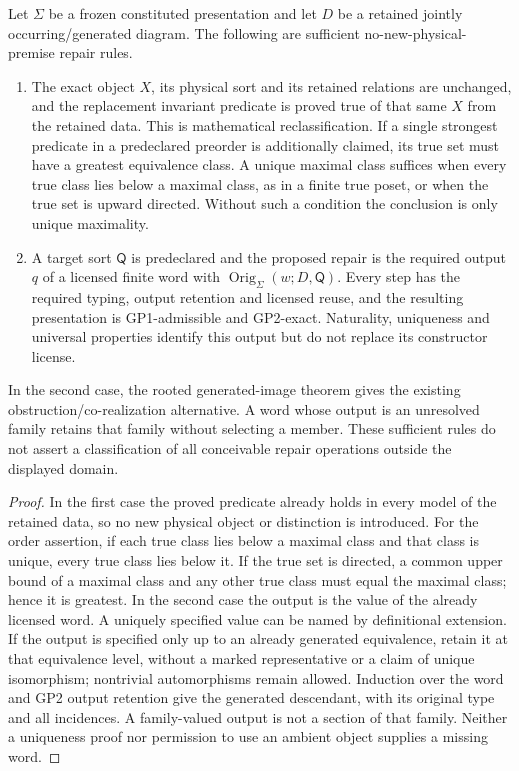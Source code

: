 \documentclass[12pt,a4paper]{article}
\begin{document}
\begin{theorem}
\label{p2a:thm:geometric-defect-repair-admission}
Let $\Sigma$ be a frozen constituted presentation and let $D$ be a retained
jointly occurring/generated diagram. The following are sufficient
no-new-physical-premise repair rules.
\begin{enumerate}
\item The exact object $X$, its physical sort and its retained relations are
unchanged, and the replacement invariant predicate is proved true of that
same $X$ from the retained data. This is mathematical reclassification.
If a single strongest predicate in a predeclared preorder is additionally
claimed, its true set must have a greatest equivalence class. A unique
maximal class suffices when every true class lies below a maximal class,
as in a finite true poset, or when the true set is upward directed.
Without such a condition the conclusion is only unique maximality.
\item A target sort $\mathsf Q$ is predeclared and the proposed repair is the
required output $q$ of a licensed finite word with
$\operatorname{Orig}_\Sigma(w;D,\mathsf Q)$. Every step has the required
typing, output retention and licensed reuse, and the resulting presentation
is GP1-admissible and GP2-exact. Naturality, uniqueness and universal
properties identify this output but do not replace its constructor license.
\end{enumerate}
In the second case, the rooted generated-image theorem gives the existing
obstruction/co-realization alternative. A word whose output is an unresolved
family retains that family without selecting a member. These sufficient
rules do not assert a classification of all conceivable repair operations
outside the displayed domain.
\end{theorem}
\begin{proof}
In the first case the proved predicate already holds in every model of the
retained data, so no new physical object or distinction is introduced.
For the order assertion, if each true class lies below a maximal class and
that class is unique, every true class lies below it. If the true set is
directed, a common upper bound of a maximal class and any other true class
must equal the maximal class; hence it is greatest.
In the second case the output is the value of the already licensed word.
A uniquely specified value can be named by definitional extension. If the
output is specified only up to an already generated equivalence, retain it at
that equivalence level, without a marked representative or a claim of unique
isomorphism; nontrivial automorphisms remain allowed.
Induction over the word and GP2 output retention give the generated
descendant, with its original type and all incidences. A family-valued output
is not a section of that family. Neither a uniqueness proof nor permission
to use an ambient object supplies a missing word.
\end{proof}
\end{document}
